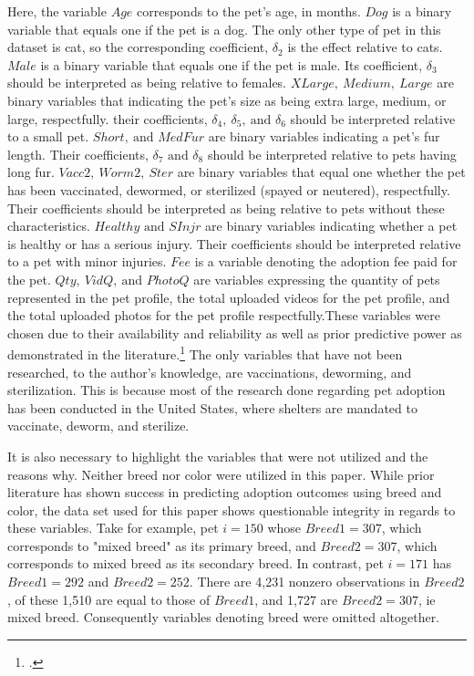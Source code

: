 \documentclass[12pt]{article}
\begin{document}
		Here, the variable $ Age $ corresponds to the pet's age, in months. $ Dog $ is a binary variable that equals one if the pet is a dog. The only other type of pet in this dataset is cat, so the corresponding coefficient, $ \delta_2 $ is the effect relative to cats. $ Male $ is a binary variable that equals one if the pet is male. Its coefficient, $ \delta_3 $ should be interpreted as being relative to females. $ XLarge,\ Medium,\ Large $ are binary variables that indicating the pet's size as being extra large, medium, or large, respectfully. their coefficients, $ \delta_4,\ \delta_5,\ \text{and } \delta_6 $ should be interpreted relative to a small pet. $ Short,\ \text{and } MedFur $ are binary variables indicating a pet's fur length. Their coefficients, $ \delta_7 \text{ and } \delta_8 $ should be interpreted relative to pets having long fur. $ Vacc2,\ Worm2,\ Ster $ are binary variables that equal one whether the pet has been vaccinated, dewormed, or sterilized (spayed or neutered), respectfully. Their coefficients should be interpreted as being relative to pets without these characteristics. $ Healthy \text{ and } SInjr $ are binary variables indicating whether a pet is healthy or has a serious injury. Their coefficients should be interpreted relative to a pet with minor injuries. $ Fee $ is a variable denoting the adoption fee paid for the pet. $ Qty,\ VidQ,\ \text{and } PhotoQ $ are variables expressing the quantity of pets represented in the pet profile, the total uploaded videos for the pet profile, and the total uploaded photos for the pet profile respectfully.These variables were chosen due to their availability and reliability as well as prior predictive power as demonstrated in the literature.\footcite{LOS,dogadopt, adoptPredict} The only variables that have not been researched, to the author's knowledge, are vaccinations, deworming, and sterilization. This is because most of the research done regarding pet adoption has been conducted in the United States, where shelters are mandated to vaccinate, deworm, and sterilize. 
		
		It is also necessary to highlight the variables that were not utilized and the reasons why. Neither breed nor color were utilized in this paper. While prior literature has shown success in predicting adoption outcomes using breed and color, the data set used for this paper shows questionable integrity in regards to these variables. Take for example, pet $ i=150 $ whose $ Breed1=307 $, which corresponds to "mixed breed" as its primary breed, and $ Breed2=307 $, which corresponds to mixed breed as its secondary breed. In contrast, pet $ i=171 $ has $ Breed1=292 $ and $ Breed2=252 $. There are 4,231 nonzero observations in $ Breed2 $, of these 1,510 are equal to those of $ Breed1 $, and 1,727 are $ Breed2=307 $, ie mixed breed. Consequently variables denoting breed were omitted altogether. 
		
\end{document}
